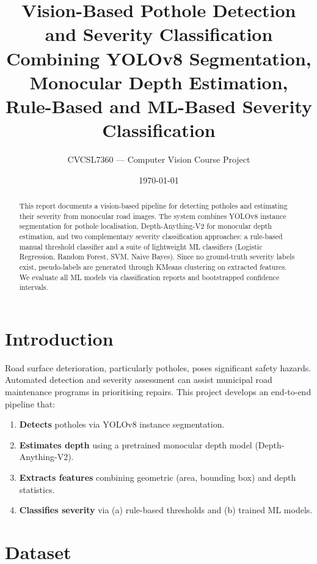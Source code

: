 \documentclass[12pt, a4paper]{article}
\title{Vision-Based Pothole Detection and Severity Classification\\[0.3em]
\large Combining YOLOv8 Segmentation, Monocular Depth Estimation,\\
Rule-Based and ML-Based Severity Classification}
\author{CVCSL7360 — Computer Vision Course Project}
\date{\today}
\begin{document}
\maketitle

\begin{abstract}
This report documents a vision-based pipeline for detecting potholes and estimating their severity from monocular road images. The system combines YOLOv8 instance segmentation for pothole localisation, Depth-Anything-V2 for monocular depth estimation, and two complementary severity classification approaches: a rule-based manual threshold classifier and a suite of lightweight ML classifiers (Logistic Regression, Random Forest, SVM, Naive Bayes). Since no ground-truth severity labels exist, pseudo-labels are generated through KMeans clustering on extracted features. We evaluate all ML models via classification reports and bootstrapped confidence intervals.
\end{abstract}

\tableofcontents
\newpage

\section{Introduction}
\label{sec:intro}

Road surface deterioration, particularly potholes, poses significant safety hazards. Automated detection and severity assessment can assist municipal road maintenance programs in prioritising repairs. This project develops an end-to-end pipeline that:

\begin{enumerate}
    \item \textbf{Detects} potholes via YOLOv8 instance segmentation.
    \item \textbf{Estimates depth} using a pretrained monocular depth model (Depth-Anything-V2).
    \item \textbf{Extracts features} combining geometric (area, bounding box) and depth statistics.
    \item \textbf{Classifies severity} via (a) rule-based thresholds and (b) trained ML models.
\end{enumerate}

\section{Dataset}
\label{sec:dataset}
\end{document}
